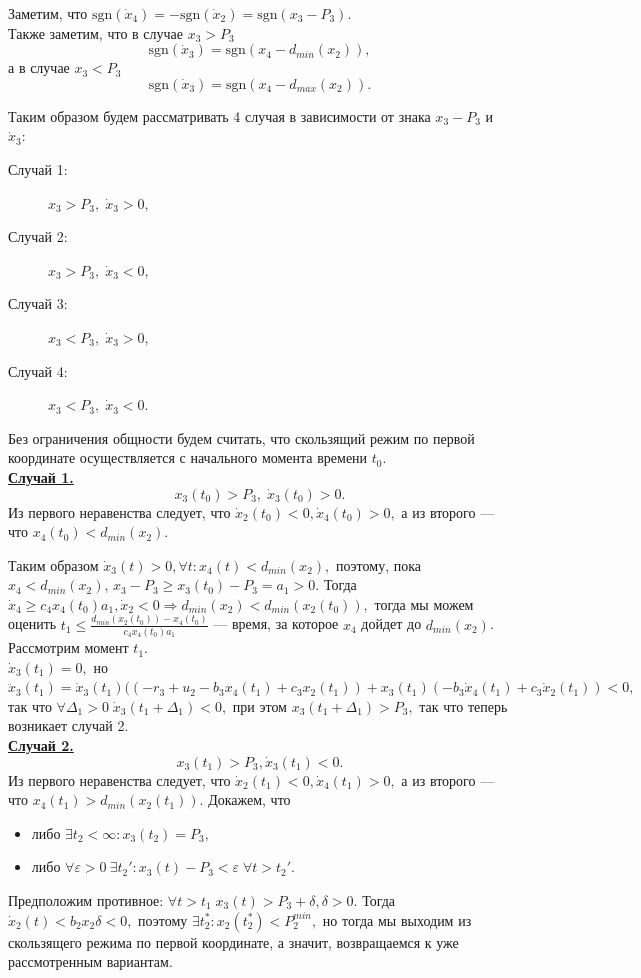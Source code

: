 \documentclass[11pt]{article}
\theoremstyle{definition}
\begin{document}
Заметим, что $\text{sgn}(\dot x_4) = -\text{sgn}(\dot x_2) = \text{sgn}(x_3 - P_3).$ \\
Также заметим, что в случае $x_3 > P_3$ $$\text{sgn}(\dot x_3) =  \text{sgn}(x_4 - d_{min}(x_2)),$$ а в случае $x_3 < P_3$ $$\text{sgn}(\dot x_3) = \text{sgn}(x_4 -d_{max}(x_2)).$$

Таким образом будем рассматривать 4 случая в зависимости от знака $x_3 - P_3$ и $\dot x_3:$


\begin{description}
	\item[Случай 1:] $x_3 > P_3, \; \dot x_3 > 0,$
	\item[Случай 2:] $x_3 > P_3, \; \dot x_3 < 0,$
	\item[Случай 3:] $x_3 < P_3, \; \dot x_3 > 0,$
	\item[Случай 4:] $x_3 < P_3, \; \dot x_3 < 0.$
\end{description}

Без ограничения общности будем считать, что скользящий режим по первой координате осуществляется с начального момента времени $t_0$.\\

\underline {\bf Случай 1.} 
$$x_3(t_0) > P_3, \; \dot x_3(t_0) > 0.$$
Из первого неравенства следует, что $\dot x_2(t_0) < 0, \dot x_4(t_0) > 0,$ а из второго --- что $x_4(t_0) < d_{min}(x_2).$

Таким образом $\dot x_3(t) > 0, \forall t : x_4(t) < d_{min}(x_2),$ поэтому, пока $x_4 < d_{min}(x_2)$, $ x_3 - P_3 \geqslant x_3(t_0) - P_3 = a_1 > 0.$ Тогда $\dot x_4 \geqslant c_4x_4(t_0)a_1, \dot x_2 < 0 \Rightarrow d_{min}(x_2) < d_{min}(x_2(t_0)),$ тогда мы можем оценить $t_1 \leqslant \frac{d_{min}(x_2(t_0)) - x_4(t_0)}{c_4x_4(t_0)a_1}$ --- время, за которое $x_4$ дойдет до $d_{min}(x_2)$.\\
Рассмотрим момент $t_1.$ \\
$\dot x_3(t_1) = 0,$ но $\ddot x_3(t_1) = \dot x_3(t_1)((-r_3 + u_2 - b_3x_4(t_1) + c_3x_2(t_1)) + x_3(t_1)(-b_3\dot x_4(t_1) + c_3 \dot x_2(t_1)) < 0,$ так что $\forall \Delta_1 > 0 \; \dot x_3(t_1 + \Delta_1) < 0,$ при этом $x_3(t_1 + \Delta_1) > P_3,$ так что теперь возникает случай 2.\\

\underline{\bf Случай 2.}
$$x_3(t_1) > P_3, \dot x_3(t_1) < 0.$$
Из первого неравенства следует, что $\dot x_2(t_1) < 0, \dot x_4(t_1) > 0,$ а из второго --- что $x_4(t_1) > d_{min}(x_2(t_1)).$ Докажем, что 
\begin{itemize}
	\item либо $\exists t_2 < \infty:  x_3(t_2) = P_3,$
	\item либо $\forall \varepsilon > 0 \: \exists t_2' : x_3(t) - P_3 < \varepsilon \; \forall t > t_2'.$
\end{itemize}
Предположим противное: $\forall t > t_1 \; x_3(t) > P_3 + \delta, \delta > 0.$ Тогда $\dot x_2(t) < b_2x_2\delta < 0,$ поэтому $\exists t_2^* : x_2(t_2^*) < P_2^{min},$ но тогда мы выходим из скользящего режима по первой координате, а значит, возвращаемся к уже рассмотренным вариантам.
\end{document}
